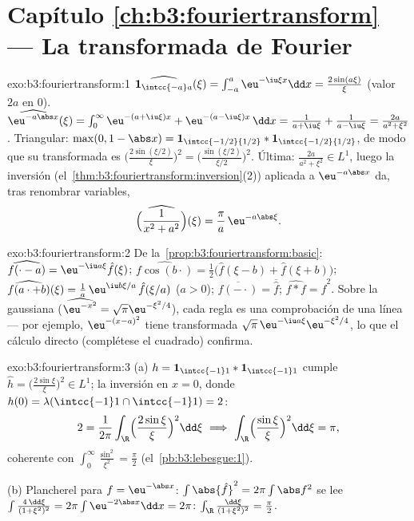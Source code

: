 \section*{Capítulo \ref{ch:b3:fouriertransform} --- La transformada
de Fourier}

\begin{solution}{exo:b3:fouriertransform:1}
$\widehat{\mathbf 1_{\intcc{-a}a}}(\xi) =
\int_{-a}^a\eu^{-\iu\xi x}\dd x = \frac{2\sin(a\xi)}{\xi}$
(valor $2a$ en $0$).
$\widehat{\eu^{-a\abs x}}(\xi) = \int_0^\infty\eu^{-(a +
\iu\xi)x} + \eu^{-(a - \iu\xi)x}\,\dd x = \frac1{a + \iu\xi} +
\frac1{a - \iu\xi} = \frac{2a}{a^2 + \xi^2}$.
Triangular: $\max(0, 1 - \abs x) = \mathbf 1_{\intcc{-1/2}{1/2}} *
\mathbf 1_{\intcc{-1/2}{1/2}}$, de modo que su transformada es
$\bigl(\frac{2\sin(\xi/2)}\xi\bigr)^2 =
\bigl(\frac{\sin(\xi/2)}{\xi/2}\bigr)^2$.
Última: $\frac{2a}{a^2+\xi^2} \in L^1$, luego la inversión
(el~\cref{thm:b3:fouriertransform:inversion}(2)) aplicada a
$\eu^{-a\abs x}$ da, tras renombrar variables,
\[
\widehat{\Bigl(\frac1{x^2 + a^2}\Bigr)}(\xi) =
\frac{\pi}{a}\,\eu^{-a\abs\xi} .
\]
\end{solution}

\begin{solution}{exo:b3:fouriertransform:2}
De la~\cref{prop:b3:fouriertransform:basic}:
$\widehat{f(\cdot - a)} = \eu^{-\iu a\xi}\hat f(\xi)$;
$\widehat{f\cos(b\cdot)} = \frac12\bigl(\hat f(\xi - b) + \hat
f(\xi + b)\bigr)$;
$\widehat{f(a\cdot + b)}(\xi) = \frac1a\,\eu^{\iu
b\xi/a}\,\hat f(\xi/a)$ ($a > 0$);
$\widehat{\overline{f(-\cdot)}} = \overline{\hat f}$;
$\widehat{f * f} = \hat f^2$. Sobre la gaussiana
($\widehat{\eu^{-x^2}} = \sqrt\pi\eu^{-\xi^2/4}$), cada regla es una
comprobación de una línea --- por ejemplo, $\eu^{-(x-a)^2}$ tiene
transformada $\sqrt\pi\,\eu^{-\iu a\xi}\eu^{-\xi^2/4}$, lo que el
cálculo directo (complétese el
cuadrado) confirma.
\end{solution}

\begin{solution}{exo:b3:fouriertransform:3}
(a) $h = \mathbf 1_{\intcc{-1}1}*\mathbf 1_{\intcc{-1}1}$ cumple
$\hat h = \bigl(\frac{2\sin\xi}\xi\bigr)^2 \in L^1$; la inversión en
$x = 0$, donde $h(0) = \lambda(\intcc{-1}1\cap\intcc{-1}1)
= 2$:
\[
2 = \frac1{2\pi}\int_\R\Bigl(\frac{2\sin\xi}\xi\Bigr)^2
\dd\xi
\ \Longrightarrow\
\int_\R\Bigl(\frac{\sin\xi}\xi\Bigr)^2\dd\xi = \pi ,
\]
coherente con $\int_0^\infty\frac{\sin^2}{\xi^2} =
\frac\pi2$ (el~\cref{pb:b3:lebesgue:1}).

(b) Plancherel para $f = \eu^{-\abs x}$: $\int\abs{\hat f}^2 =
2\pi\int\abs f^2$ se lee $\int\frac{4\,\dd\xi}{(1 + \xi^2)^2} =
2\pi\int\eu^{-2\abs x}\dd x = 2\pi$:
$\int_\R\frac{\dd\xi}{(1+\xi^2)^2} = \frac\pi2$.
\end{solution}

